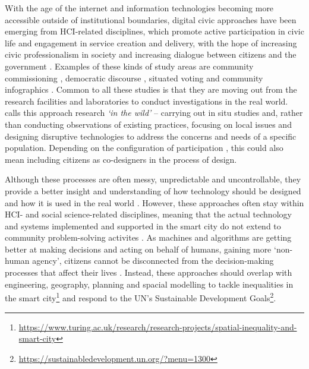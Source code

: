 With the age of the internet and information technologies becoming more accessible outside of institutional boundaries, digital civic approaches \citep{olivier_digital_2015} have been emerging from HCI-related disciplines, which promote active participation in civic life and engagement in service creation and delivery, with the hope of increasing civic professionalism \citep{boyte_boyte_2010} in society and increasing dialogue between citizens and the government \citet{boyte_everyday_2004}. Examples of these kinds of study areas are community commissioning \citep{taylor_supporting_2009,taylor_creating_2010,balaam_feedfinder:_2015,garbett_app_2016}, democratic discourse \citep{valkanova_myposition:_2014,crivellaro_contesting_2015,johnson_reflections_2016,johnson_community_2017}, situated voting \citep{taylor_viewpoint:_2012,behrens_smart_2014,vlachokyriakos_postervote:_2014,hespanhol_vote_2015,golsteijn_sens-us:_2016} and community infographics \citep{claes_street_2013,koeman_what_2014,lindley_surfacing_2017}. Common to all these studies is that they are moving out from the research facilities and laboratories to conduct investigations in the real world. \citet{rogers_interaction_2011} calls this approach research \textit{`in the wild'} -- carrying out in situ studies and, rather than conducting observations of existing practices, focusing on local issues and designing disruptive technologies to address the concerns and needs of a specific population. Depending on the configuration of participation \citep{vines_configuring_2013}, this could also mean including citizens as co-designers in the process of design.

Although these processes are often messy, unpredictable and uncontrollable, they provide a better insight and understanding of how technology should be designed and how it is used in the real world \citep{suchman_plans_1985,suchman_human-machine_2007}. However, these approaches often stay within HCI- and social science-related disciplines, meaning that the actual technology and systems implemented and supported in the smart city do not extend to community problem-solving activites \citep{stillman_community_2009}. As machines and algorithms are getting better at making decisions and acting on behalf of humans, gaining more `non-human agency', citizens cannot be disconnected from the decision-making processes that affect their lives \citep{graham_too-smart_2014}. Instead, these approaches should overlap with engineering, geography, planning and spacial modelling to tackle inequalities in the smart city\footnote{\url{https://www.turing.ac.uk/research/research-projects/spatial-inequality-and-smart-city}} and respond to the UN's 
Sustainable Development Goals\footnote{\url{https://sustainabledevelopment.un.org/?menu=1300}}.

